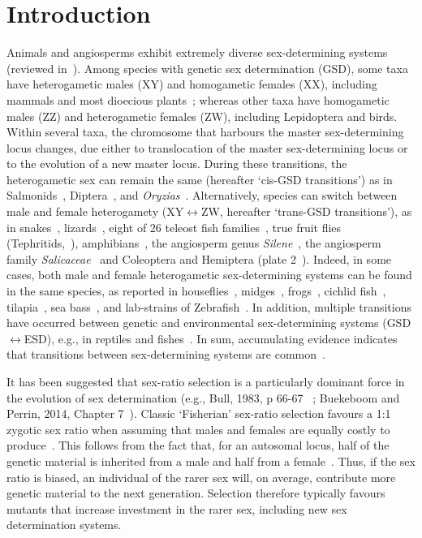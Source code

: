 \documentclass[10pt,letterpaper]{article}
\begin{document}
\section*{Introduction}
Animals and angiosperms exhibit extremely diverse sex-determining systems (reviewed in~\cite{Bull:1983vi,Charlesworth:2010it,Beukeboom:2014vb,Bachtrog:2014bx, Pennell2018}). 
Among species with genetic sex determination (GSD), some taxa have heterogametic males (XY) and homogametic females (XX), including mammals and most dioecious plants~\cite{Ming:2011iy}; whereas other taxa have homogametic males (ZZ) and heterogametic females (ZW), including Lepidoptera and birds. 
Within several taxa, the chromosome that harbours the master sex-determining locus changes, due either to translocation of the master sex-determining locus or to the evolution of a new master locus.  
During these transitions, the heterogametic sex can remain the same (hereafter `cis-GSD transitions') as in Salmonids~\cite{Li:2011fm,Yano:2012di}, Diptera~\cite{Vicoso:2015hf}, and \textit{Oryzias}~\cite{Myosho:2012fv}. 
Alternatively, species can switch between male and female heterogamety (XY$\leftrightarrow$ZW, hereafter `trans-GSD transitions'), as in snakes~\cite{Gamble2017}, lizards~\cite{Ezaz:2009tk}, eight of 26 teleost fish families~\cite{Mank:2006bt}, true fruit flies (Tephritids,~\cite{Vicoso:2015hf}), amphibians~\cite{Hillis:1990gu}, the angiosperm genus \textit{Silene}~\cite{Slancarova:2013dq}, the angiosperm family \textit{Salicaceae}~\cite{Pucholt2015,Pucholt2017} and Coleoptera and Hemiptera (plate 2~\cite{Beukeboom:2014vb}).
Indeed, in some cases, both male and female heterogametic sex-determining systems can be found in the same species, as reported in houseflies~\cite{Macdonald1978}, midges~\cite{Thompson1971}, frogs~\cite{Ogata:2007jm}, cichlid fish~\cite{Ser:2010iq}, tilapia~\cite{Lee2004}, sea bass~\cite{Vandeputte2007}, and lab-strains of Zebrafish~\cite{Liew2012,Wilson2014}.
In addition, multiple transitions have occurred between genetic and environmental sex-determining systems (GSD$\leftrightarrow$ESD), e.g., in reptiles and fishes~\cite{Conover:1987in,Mank:2006bt,Pokorna:2009ui,Ezaz:2009tk,Pen:2010kk,Holleley:2015hc, Pennell2018}.
In sum, accumulating evidence indicates that transitions between sex-determining systems are common~\cite{Bachtrog:2014bx}.

It has been suggested that sex-ratio selection is a particularly dominant force in the evolution of sex determination (e.g., Bull, 1983, p 66-67 ~\cite{Bull:1983vi}; Buekeboom and Perrin, 2014, Chapter 7~\cite{Beukeboom:2014vb}). 
Classic `Fisherian' sex-ratio selection favours a 1:1 zygotic sex ratio when assuming that males and females are equally costly to produce~\cite{Fisher:1930wy,Charnov:1982wg}. 
This follows from the fact that, for an autosomal locus, half of the genetic material is inherited from a male and half from a female~\cite{West:2009we}. 
Thus, if the sex ratio is biased, an individual of the rarer sex will, on average, contribute more genetic material to the next generation. 
Selection therefore typically favours mutants that increase investment in the rarer sex, including new sex determination systems.
\end{document}
